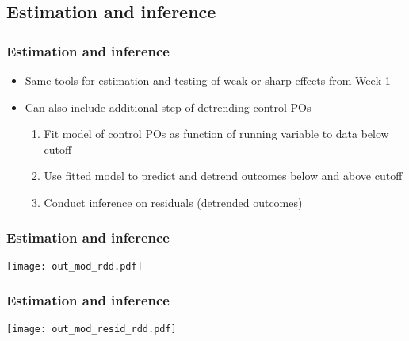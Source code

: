 \documentclass[table, xcolor = {dvipsnames}, 9pt]{beamer}
\theoremstyle{plain}
\begin{document}
\subsection{Estimation and inference}
\begin{frame}
\frametitle{Estimation and inference} 
\vfill
\begin{itemize} \vfill
\item Same tools for estimation and testing of weak or sharp effects from Week 1 \vfill
\item Can also include additional step of detrending control POs \\ \citep{saleshansenrowan2018,saleshansen2020} \vfill
\begin{enumerate} \vfill
\item Fit model of control POs as function of running variable to data below cutoff \vfill
\item Use fitted model to predict and detrend outcomes below and above cutoff \vfill
\item Conduct inference on residuals (detrended outcomes) \vfill
\end{enumerate} \vfill
\end{itemize} \vfill
\end{frame}
\begin{frame}
\frametitle{Estimation and inference} 
\vfill
\begin{center}
\texttt{[image: out\_mod\_rdd.pdf]}
\end{center}
\vfill
\end{frame}
\begin{frame}
\frametitle{Estimation and inference} 
\vfill
\begin{center}
\texttt{[image: out\_mod\_resid\_rdd.pdf]}
\end{center}
\vfill
\end{frame}
\end{document}
